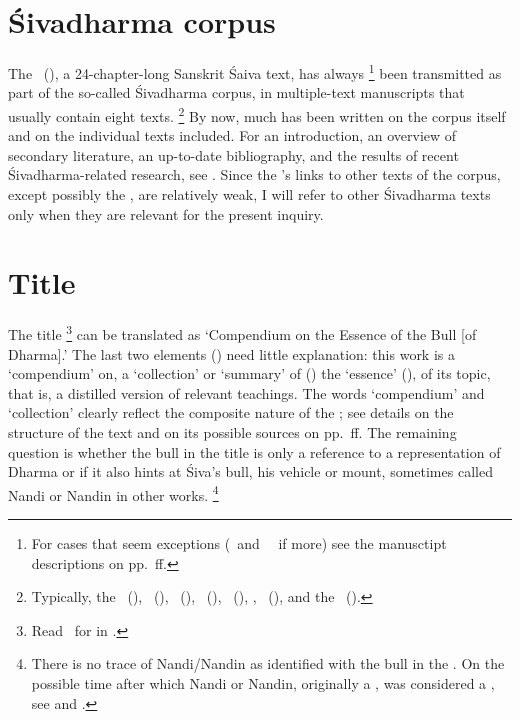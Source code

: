 

\thispagestyle{empty}
\frenchspacing

\section{Śivadharma corpus}
\fancyhead[LE]{}
\fancyhead[RE]{}
\fancyhead[LO]{}
\fancyhead[RO]{}

The \Vss\ (\VSS), a 24-chapter-long Sanskrit Śaiva text,
has always%
		\footnote{For cases that seem exceptions 
		(\msKoa\ and \msPaperA\ \CHECK\ if more)
						see the manusctipt descriptions
						on pp.~\pageref{mss_descr}ff.}
been transmitted as part of the so-called Śivadharma corpus,
in multiple-text manuscripts that usually contain 
eight texts.%
	\footnote{Typically, the \SDhS\ (\SDHS), \SDhU\ (\SDHU), \SDhSangr\ (\SDHSANGR),
	\Ums\ (\UMS), \Uums\ (\UUMS), \VSS, \DharmP\ (\DHARMP), and the \SivaUp\ (\SIVAUP).}
By now, much has been written
on the corpus itself and on the individual
texts included. 
For an introduction, an overview of secondary 
literature, an up-to-date bibliography, and the results of 
recent Śivadharma-related research, see . 
Since the \VSS's links to other texts of the corpus, 
except possibly the \DharmP, 
are relatively weak, I will refer to other
Śivadharma texts only when they are relevant
for the present inquiry.



\section{Title}\label{title}
The title \Vss%
	\footnote{Read \Vss\ for 
	in .}
can be translated as
`Compendium on the Essence of the Bull [of Dharma].'
The last two elements () need
little explanation: this work is a 
`compendium' on, a `collection' or `summary' of ()
the `essence' (), of its topic, that is, a distilled
version of relevant teachings.
The words `compendium' and `collection' clearly reflect the composite nature of
the \VSS; see details on the structure of the text and
on its possible sources on pp.~\pageref{structure}ff.
The\label{bull} remaining question is whether the bull in the title 
is only a reference to a representation of Dharma 
or if it also hints at Śiva's bull, his vehicle or mount,
sometimes called Nandi or Nandin in other works.%
		\footnote{There is no trace of Nandi/Nandin
		as identified with the bull in the \Vss.
		On the possible time after which 
		Nandi or Nandin, originally a ,
		was considered a , see 
		 and 
		.}

